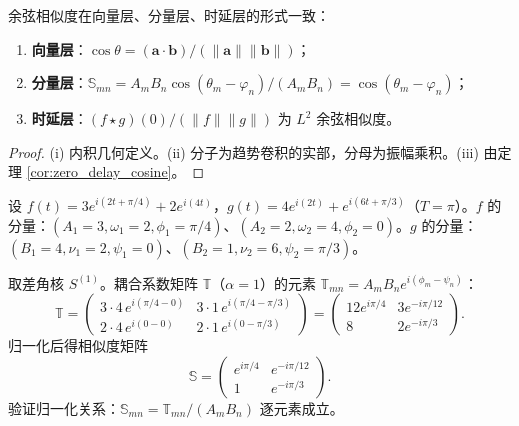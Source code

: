 \begin{theorem}[余弦相似度的三层一致]\label{thm:three_layer_identity}
余弦相似度在向量层、分量层、时延层的形式一致：
\begin{enumerate}[label=(\roman*)]
    \item \textbf{向量层}：$\cos\theta = (\mathbf{a} \cdot \mathbf{b})/(\|\mathbf{a}\| \|\mathbf{b}\|)$；
    \item \textbf{分量层}：$\mathbb{S}_{mn} = A_m B_n \cos(\theta_m - \varphi_n)/(A_m B_n) = \cos(\theta_m - \varphi_n)$；
    \item \textbf{时延层}：$(f \star g)(0)/(\|f\| \|g\|)$ 为 $L^2$ 余弦相似度。
\end{enumerate}
\end{theorem}

\begin{proof}
(i) 内积几何定义。(ii) 分子为趋势卷积的实部，分母为振幅乘积。(iii) 由定理 \ref{cor:zero_delay_cosine}。
\end{proof}

\begin{example}[分量层耦合系数的数值示例]\label{ex:component_tendency_similarity}
设 $f(t) = 3 e^{i(2t + \pi/4)} + 2 e^{i(4t)}$，$g(t) = 4 e^{i(2t)} + e^{i(6t + \pi/3)}$（$T = \pi$）。$f$ 的分量：$(A_1=3, \omega_1=2, \phi_1=\pi/4)$、$(A_2=2, \omega_2=4, \phi_2=0)$。$g$ 的分量：$(B_1=4, \nu_1=2, \psi_1=0)$、$(B_2=1, \nu_2=6, \psi_2=\pi/3)$。

取差角核 $S^{(1)}$。耦合系数矩阵 $\mathbb{T}$（$\alpha = 1$）的元素 $\mathbb{T}_{mn} = A_m B_n e^{i(\phi_m - \psi_n)}$：
\[
\mathbb{T} = \begin{pmatrix}
3 \cdot 4\, e^{i(\pi/4 - 0)} & 3 \cdot 1\, e^{i(\pi/4 - \pi/3)} \\
2 \cdot 4\, e^{i(0 - 0)} & 2 \cdot 1\, e^{i(0 - \pi/3)}
\end{pmatrix}
= \begin{pmatrix}
12 e^{i\pi/4} & 3 e^{-i\pi/12} \\
8 & 2 e^{-i\pi/3}
\end{pmatrix}.
\]
归一化后得相似度矩阵
\[
\mathbb{S} = \begin{pmatrix}
e^{i\pi/4} & e^{-i\pi/12} \\
1 & e^{-i\pi/3}
\end{pmatrix}.
\]
验证归一化关系：$\mathbb{S}_{mn} = \mathbb{T}_{mn}/(A_m B_n)$ 逐元素成立。
\end{example}

